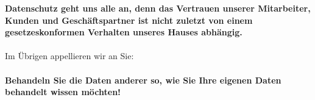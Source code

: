 \documentclass[../Vorlagen/de-RSE_Kopf,a4paper]{scrlttr2}
\begin{document}
\textbf{Datenschutz geht uns alle an, denn das Vertrauen unserer Mitarbeiter, Kunden und Geschäftspartner ist nicht zuletzt von einem gesetzeskonformen Verhalten unseres Hauses abhängig.} \\
\\
Im Übrigen appellieren wir an Sie: \\
\\
\textbf{Behandeln Sie die Daten anderer so, wie Sie Ihre eigenen Daten behandelt wissen möchten!}

\end{document}
